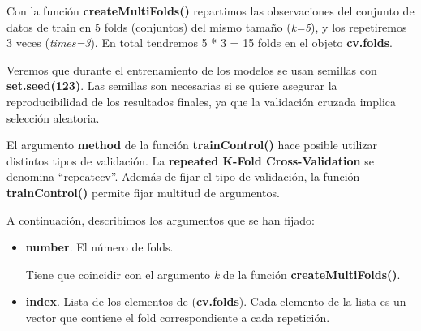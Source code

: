 \documentclass[]{article}
\newenvironment{Shaded}{\begin{snugshade}}{\end{snugshade}}
\newcommand{\DataTypeTok}[1]{\textcolor[rgb]{0.13,0.29,0.53}{#1}}
\newcommand{\DecValTok}[1]{\textcolor[rgb]{0.00,0.00,0.81}{#1}}
\newcommand{\KeywordTok}[1]{\textcolor[rgb]{0.13,0.29,0.53}{\textbf{#1}}}
\newcommand{\NormalTok}[1]{#1}
\newcommand{\OperatorTok}[1]{\textcolor[rgb]{0.81,0.36,0.00}{\textbf{#1}}}
\newcommand{\OtherTok}[1]{\textcolor[rgb]{0.56,0.35,0.01}{#1}}
\newcommand{\StringTok}[1]{\textcolor[rgb]{0.31,0.60,0.02}{#1}}
\providecommand{\tightlist}{%
  \setlength{\itemsep}{0pt}\setlength{\parskip}{0pt}}
\begin{document}
Con la función \textbf{createMultiFolds()} repartimos las observaciones del conjunto de datos de train en 5 folds (conjuntos) del mismo tamaño (\emph{k=5}), y los repetiremos 3 veces (\emph{times=3}). En total tendremos 5 * 3 = 15 folds en el objeto \textbf{cv.folds}.

Veremos que durante el entrenamiento de los modelos se usan semillas con \textbf{set.seed(123)}. Las semillas son necesarias si se quiere asegurar la reproducibilidad de los resultados finales, ya que la validación cruzada implica selección aleatoria.

\vspace{3mm}

\begin{Shaded}
\end{Shaded}

El argumento \textbf{method} de la función \textbf{trainControl()} hace
posible utilizar distintos tipos de validación. La \textbf{repeated K-Fold Cross-Validation} se denomina
``repeatecv''. Además de fijar el tipo de validación, la función \textbf{trainControl()} permite
fijar multitud de argumentos. 

A continuación, describimos los argumentos que se han fijado:

\begin{itemize}
\tightlist
\item
  \textbf{number}. El número de folds. 
  
  Tiene que coincidir con el argumento \textit{k} de la función \textbf{createMultiFolds()}. 
\item
  \textbf{index}. Lista de los elementos de (\textbf{cv.folds}). Cada elemento de la lista es un vector que contiene el fold correspondiente a cada repetición. 
\end{itemize}
\end{document}
